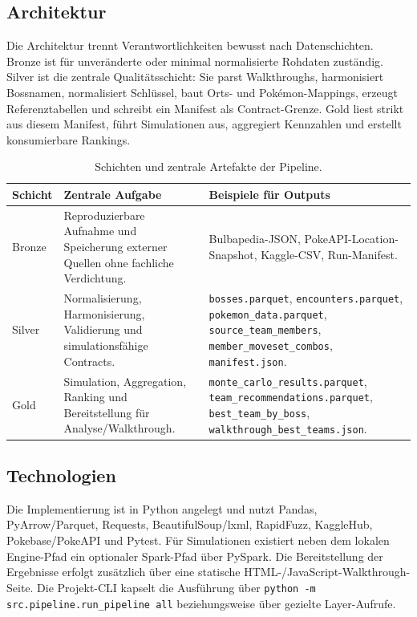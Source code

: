 \documentclass[sigconf,nonacm]{acmart}
\begin{document}
\subsection{Architektur}
Die Architektur trennt Verantwortlichkeiten bewusst nach Datenschichten. Bronze ist für unveränderte oder minimal normalisierte Rohdaten zuständig. Silver ist die zentrale Qualitätsschicht: Sie parst Walkthroughs, harmonisiert Bossnamen, normalisiert Schlüssel, baut Orts- und Pokémon-Mappings, erzeugt Referenztabellen und schreibt ein Manifest als Contract-Grenze. Gold liest strikt aus diesem Manifest, führt Simulationen aus, aggregiert Kennzahlen und erstellt konsumierbare Rankings.

\begin{table}[t]
  \caption{Schichten und zentrale Artefakte der Pipeline.}
  \label{tab:schichten}
  \begin{tabularx}{\textwidth}{@{}lXX@{}}
    \toprule
    Schicht & Zentrale Aufgabe & Beispiele für Outputs \\
    \midrule
    Bronze & Reproduzierbare Aufnahme und Speicherung externer Quellen ohne fachliche Verdichtung. & Bulbapedia-JSON, PokeAPI-Location-Snapshot, Kaggle-CSV, Run-Manifest. \\
    Silver & Normalisierung, Harmonisierung, Validierung und simulationsfähige Contracts. & \texttt{bosses.parquet}, \texttt{encounters.parquet}, \texttt{pokemon\_data.parquet}, \texttt{source\_team\_members}, \texttt{member\_moveset\_combos}, \texttt{manifest.json}. \\
    Gold & Simulation, Aggregation, Ranking und Bereitstellung für Analyse/Walkthrough. & \texttt{monte\_carlo\_results.parquet}, \texttt{team\_recommendations.parquet}, \texttt{best\_team\_by\_boss}, \texttt{walkthrough\_best\_teams.json}. \\
    \bottomrule
  \end{tabularx}
\end{table}

\subsection{Technologien}
Die Implementierung ist in Python angelegt und nutzt Pandas, PyArrow/Parquet, Requests, BeautifulSoup/lxml, RapidFuzz, KaggleHub, Pokebase/PokeAPI und Pytest. Für Simulationen existiert neben dem lokalen Engine-Pfad ein optionaler Spark-Pfad über PySpark. Die Bereitstellung der Ergebnisse erfolgt zusätzlich über eine statische HTML-/JavaScript-Walkthrough-Seite. Die Projekt-CLI kapselt die Ausführung über \texttt{python -m src.pipeline.run\_pipeline all} beziehungsweise über gezielte Layer-Aufrufe.
\end{document}
